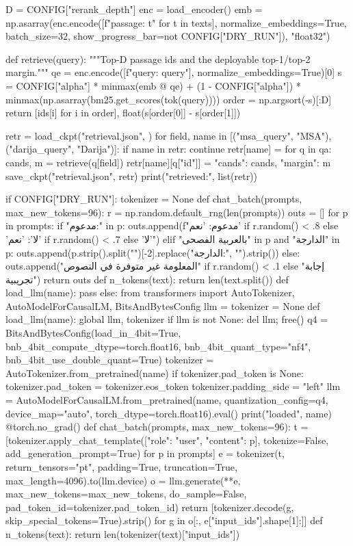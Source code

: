 D = CONFIG["rerank_depth"]
enc = load_encoder()
emb = np.asarray(enc.encode([f"passage: {t}" for t in texts], normalize_embeddings=True,
                            batch_size=32, show_progress_bar=not CONFIG["DRY_RUN"]), "float32")

def retrieve(query):
    """Top-D passage ids and the deployable top-1/top-2 margin."""
    qe = enc.encode([f"query: {query}"], normalize_embeddings=True)[0]
    s = CONFIG["alpha"] * minmax(emb @ qe) + (1 - CONFIG["alpha"]) * minmax(np.asarray(bm25.get_scores(tok(query))))
    order = np.argsort(-s)[:D]
    return [ids[i] for i in order], float(s[order[0]] - s[order[1]])

retr = load_ckpt("retrieval.json", {})
for field, name in [("msa_query", "MSA"), ("darija_query", "Darija")]:
    if name in retr:
        continue
    retr[name] = {}
    for q in qa:
        cands, m = retrieve(q[field])
        retr[name][q["id"]] = {"cands": cands, "margin": m}
    save_ckpt("retrieval.json", retr)
print("retrieved:", list(retr))

if CONFIG["DRY_RUN"]:
    tokenizer = None
    def chat_batch(prompts, max_new_tokens=96):
        r = np.random.default_rng(len(prompts))
        outs = []
        for p in prompts:
            if "مدعوم:" in p:
                outs.append(f"مدعوم: {'نعم' if r.random() < .8 else 'لا'}: {'نعم' if r.random() < .7 else 'لا'}")
            elif "بالعربية الفصحى" in p and "الدارجة" in p:
                outs.append(p.strip().split("\n")[-2].replace("الدارجة:", "").strip())
            else:
                outs.append("المعلومة غير متوفرة في النصوص" if r.random() < .1 else "إجابة تجريبية")
        return outs
    def n_tokens(text): return len(text.split())
    def load_llm(name): pass
else:
    from transformers import AutoTokenizer, AutoModelForCausalLM, BitsAndBytesConfig
    llm = tokenizer = None
    def load_llm(name):
        global llm, tokenizer
        if llm is not None:
            del llm; free()
        q4 = BitsAndBytesConfig(load_in_4bit=True, bnb_4bit_compute_dtype=torch.float16,
                                bnb_4bit_quant_type="nf4", bnb_4bit_use_double_quant=True)
        tokenizer = AutoTokenizer.from_pretrained(name)
        if tokenizer.pad_token is None:
            tokenizer.pad_token = tokenizer.eos_token
        tokenizer.padding_side = "left"
        llm = AutoModelForCausalLM.from_pretrained(name, quantization_config=q4, device_map="auto",
                                                   torch_dtype=torch.float16).eval()
        print("loaded", name)
    @torch.no_grad()
    def chat_batch(prompts, max_new_tokens=96):
        t = [tokenizer.apply_chat_template([{"role": "user", "content": p}], tokenize=False,
                                           add_generation_prompt=True) for p in prompts]
        e = tokenizer(t, return_tensors="pt", padding=True, truncation=True, max_length=4096).to(llm.device)
        o = llm.generate(**e, max_new_tokens=max_new_tokens, do_sample=False,
                         pad_token_id=tokenizer.pad_token_id)
        return [tokenizer.decode(g, skip_special_tokens=True).strip() for g in o[:, e["input_ids"].shape[1]:]]
    def n_tokens(text): return len(tokenizer(text)["input_ids"])

